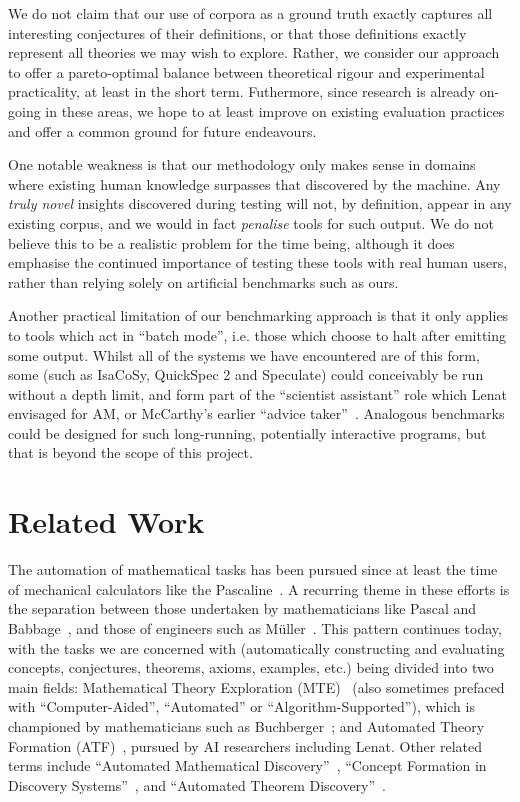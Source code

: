 We do not claim that our use of corpora as a ground truth exactly captures all
interesting conjectures of their definitions, or that those definitions exactly
represent all theories we may wish to explore. Rather, we consider our approach
to offer a pareto-optimal balance between theoretical rigour and experimental
practicality, at least in the short term. Futhermore, since research is already
on-going in these areas, we hope to at least improve on existing evaluation
practices and offer a common ground for future endeavours.

One notable weakness is that our methodology only makes sense in domains where
existing human knowledge surpasses that discovered by the machine. Any
\emph{truly novel} insights discovered during testing will not, by definition,
appear in any existing corpus, and we would in fact \emph{penalise} tools for
such output. We do not believe this to be a realistic problem for the time
being, although it does emphasise the continued importance of testing these
tools with real human users, rather than relying solely on artificial benchmarks
such as ours.

Another practical limitation of our benchmarking approach is that it only
applies to tools which act in ``batch mode'', i.e. those which choose to halt
after emitting some output. Whilst all of the systems we have encountered are of
this form, some (such as IsaCoSy, QuickSpec 2 and Speculate) could conceivably
be run without a depth limit, and form part of the ``scientist assistant'' role
which Lenat envisaged for AM, or McCarthy's earlier ``advice
taker''~\cite{McCarthy_Programs59}. Analogous benchmarks could be designed for
such long-running, potentially interactive programs, but that is beyond the
scope of this project.

\section{Related Work}
\label{sec:related-work}

The automation of mathematical tasks has been pursued since at least the time of
mechanical calculators like the Pascaline~\cite{d'ocagne}. A recurring theme in
these efforts is the separation between those undertaken by mathematicians like
Pascal and Babbage~\cite{bowden}, and those of engineers such as
M\"uller~\cite[p. 65]{lindgren}. This pattern continues today, with the tasks we
are concerned with (automatically constructing and evaluating concepts,
conjectures, theorems, axioms, examples, etc.) being divided into two main
fields: Mathematical Theory Exploration (MTE)~\cite{buchberger:06} (also
sometimes prefaced with ``Computer-Aided'', ``Automated'' or
``Algorithm-Supported''), which is championed by mathematicians such as
Buchberger~\cite{buchberger}; and Automated Theory Formation
(ATF)~\cite{lenat:77,colton:book}, pursued by AI researchers including Lenat.
Other related terms include ``Automated Mathematical
Discovery''~\cite{epstein:91,colton2000notion,esarm2008},
``Concept Formation in Discovery Systems''~\cite{haase}, and
``Automated Theorem Discovery''~\cite{roy}.


